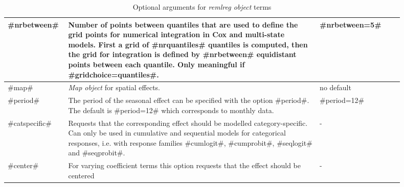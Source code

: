 \begin{table}[ht]
\begin{tabular}{|p{0.1\linewidth}|p{0.6\linewidth}|p{0.2\linewidth}|}
 \hline
 #nrbetween# & Number of points between quantiles that are used to define the grid points for numerical integration in Cox and multi-state models. First a grid of #nrquantiles# quantiles is computed, then the grid for integration is defined by #nrbetween# equidistant points between each quantile. Only meaningful if #gridchoice=quantiles#.& #nrbetween=5#\\
 \hline
 #map# & {\em Map object} for spatial effects. & no default\\
 \hline
 #period# & The period of the seasonal effect can be specified with the option #period#. The default is #period=12# which corresponds to monthly data. & #period=12# \\
 \hline
 #catspecific# & Requests that the corresponding effect should be modelled category-specific. Can only be used in cumulative and sequential models for categorical responses, i.e. with response families #cumlogit#, #cumprobit#, #seqlogit# and #seqprobit#. & - \\
 \hline
 #center# & For varying coefficient terms this option requests that the effect should be centered & - \\
 \hline
\end{tabular}
{\em \caption{\label{remlregoptions} Optional arguments for {\em
remlreg object} terms}}
\end{table}

